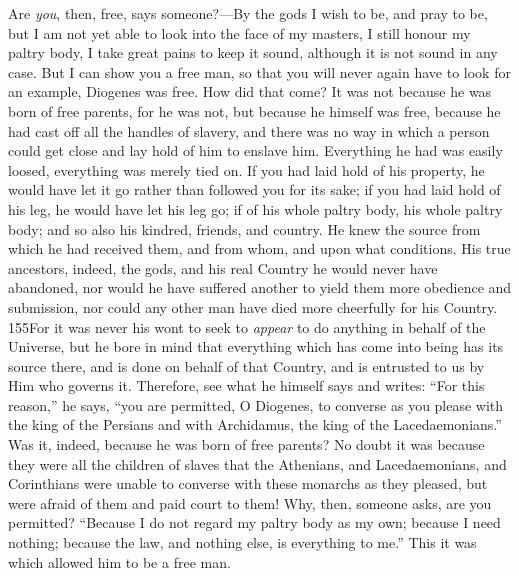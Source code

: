 Are \emph{you}, then, free, says someone?—By the gods I wish to be, and pray to be, but I am not yet able to look into the face of my masters, I still honour my paltry body, I take great pains to keep it sound, although it is not sound in any case. But I can show you a free man, so that you will never again have to look for an example, Diogenes was free. How did that come? It was not because he was born of free parents, for he was not, but because he himself was free, because he had cast off all the handles of slavery, and there was no way in which a person could get close and lay hold of him to enslave him. Everything he had was easily loosed, everything was merely tied on. If you had laid hold of his property, he would have let it go rather than followed you for its sake; if you had laid hold of his leg, he would have let his leg go; if of his whole paltry body, his whole paltry body; and so also his kindred, friends, and country. He knew the source from which he had received them, and from whom, and upon what conditions. His true ancestors, indeed, the gods, and his real Country he would never have abandoned, nor would he have suffered another to yield them more obedience and submission, nor could any other man have died more cheerfully for his Country. 155For it was never his wont to seek to \emph{appear} to do anything in behalf of the Universe, but he bore in mind that everything which has come into being has its source there, and is done on behalf of that Country, and is entrusted to us by Him who governs it. Therefore, see what he himself says and writes: ``For this reason,'' he says, ``you are permitted, O Diogenes, to converse as you please with the king of the Persians and with Archidamus, the king of the Lacedaemonians.'' Was it, indeed, because he was born of free parents? No doubt it was because they were all the children of slaves that the Athenians, and Lacedaemonians, and Corinthians were unable to converse with these monarchs as they pleased, but were afraid of them and paid court to them! Why, then, someone asks, are you permitted? ``Because I do not regard my paltry body as my own; because I need nothing; because the law, and nothing else, is everything to me.'' This it was which allowed him to be a free man.

